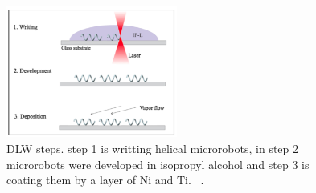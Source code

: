 \documentclass[12pt,a4paper,titlepage]{report}
\begin{document}
\begin{figure}
  \begin{center}
    \includegraphics[width=0.5\textwidth]{tempreture}
  \caption{DLW steps. step 1 is writting helical microrobots, in step 2 microrobots were 
developed in isopropyl alcohol and step 3 is coating them by a layer of Ni and Ti. ~\citep{qiu2014artificial}.}
  \label{tempreture}
\end{center}
\end{figure}
\end{document}
